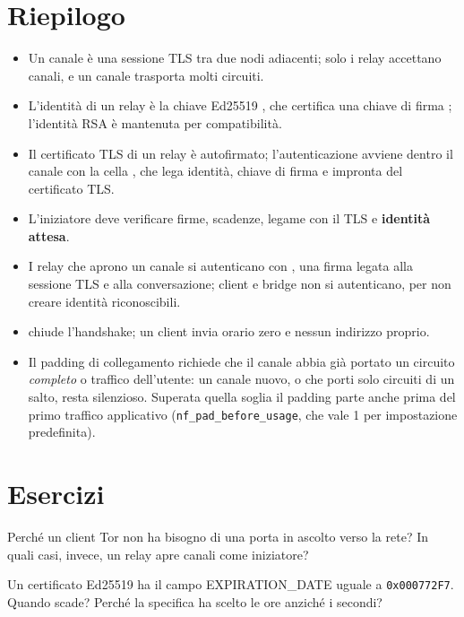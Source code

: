 \section*{Riepilogo}
\begin{itemize}
  \item Un canale è una sessione TLS tra due nodi adiacenti; solo i relay accettano canali, e un canale trasporta molti circuiti.
  \item L'identità di un relay è la chiave Ed25519 , che certifica una chiave di firma ; l'identità RSA è mantenuta per compatibilità.
  \item Il certificato TLS di un relay è autofirmato; l'autenticazione avviene dentro il canale con la cella , che lega identità, chiave di firma e impronta del certificato TLS.
  \item L'iniziatore deve verificare firme, scadenze, legame con il TLS e \textbf{identità attesa}.
  \item I relay che aprono un canale si autenticano con , una firma legata alla sessione TLS e alla conversazione; client e bridge non si autenticano, per non creare identità riconoscibili.
  \item {} chiude l'handshake; un client invia orario zero e nessun indirizzo proprio.
  \item Il padding di collegamento richiede che il canale abbia già portato un circuito \emph{completo} o traffico dell'utente: un canale nuovo, o che porti solo circuiti di un salto, resta silenzioso. Superata quella soglia il padding parte anche prima del primo traffico applicativo (\texttt{nf\_pad\_before\_usage}, che vale 1 per impostazione predefinita).
\end{itemize}

\section*{Esercizi}

\begin{esercizio}[1]\label{es:07-ruoli}
Perché un client Tor non ha bisogno di una porta in ascolto verso la rete? In quali casi, invece, un relay apre canali come iniziatore?
\end{esercizio}

\begin{esercizio}[1]\label{es:07-scadenza}
Un certificato Ed25519 ha il campo EXPIRATION\_DATE uguale a \texttt{0x000772F7}. Quando scade? Perché la specifica ha scelto le ore anziché i secondi?
\end{esercizio}

